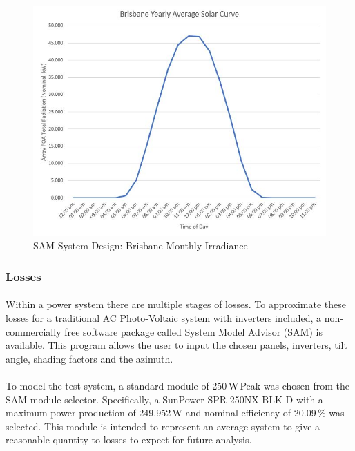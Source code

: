 \begin{figure}[H]
	\hfill\includegraphics[width = 120mm]{images/sam/test1-dailyirradiance}\hspace*{\fill}
	\caption{SAM System Design: Brisbane Monthly Irradiance} 
	\label{fig:SAM-test1-dailyirradiance}
\end{figure}

\subsubsection{Losses}

\paragraph{}
Within a power system there are multiple stages of losses. To approximate these losses for a traditional AC Photo-Voltaic system with inverters included, a non-commercially free software package called System Model Advisor (SAM) is available. This program allows the user to input the chosen panels, inverters, tilt angle, shading factors and the azimuth. 

\paragraph{}
To model the test system, a standard module of 250\,W\,Peak was chosen from the SAM module selector. Specifically, a SunPower SPR-250NX-BLK-D with a maximum power production of 249.952\,W and nominal efficiency of 20.09\,\% was selected. This module is intended to represent an average system to give a reasonable quantity to losses to expect for future analysis. 

